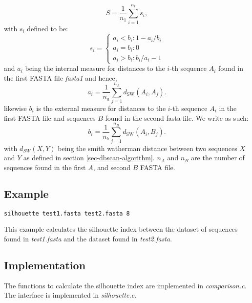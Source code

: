 \begin{equation}
  S=\frac{1}{n_1}\sum_{i=1}^{n_{1}} s_{i},
\end{equation}
with $s_i$ defined to be:
\begin{equation}
  s_i=\left\{
  \begin{array}{l}
    a_i < b_i : 1-a_i/b_i \\
    a_i = b_i : 0 \\
    a_i > b_i : b_i/a_i-1
  \end{array} \right.
\end{equation}
and $a_i$ being the internal measure for distances to the $i$-th
sequence $A_i$ found in the first FASTA file \emph{fasta1} and hence,
\begin{equation}
  a_i = \frac{1}{n_a}\sum_{j=1}^{n_A}d_{\mathrm{SW}}(A_i,A_j).
\end{equation}
likewise $b_i$ is the external measure for distances to the $i$-th
sequence $A_i$ in the first FASTA file and sequences $B$ found in the
second fasta file. We write as such:
\begin{equation}
  b_i = \frac{1}{n_b}\sum_{j=1}^{n_B}d_{\mathrm{SW}}(A_i,B_j).
\end{equation}
with $d_{SW}(X,Y)$ being the smith watherman distance between two
sequences $X$ and $Y$ as defined in section
\ref{sec-dbscan-algorithm}. $n_A$ and $n_B$ are the number of
sequences found in the first $A$, and second $B$ FASTA file. 

\subsection{Example}
\begin{lstlisting}
silhouette test1.fasta test2.fasta 8
\end{lstlisting}
This example calculates the silhouette index between the dataset of
sequences found  in \emph{test1.fasta} and the dataset found in
\emph{test2.fasta}.

\subsection{Implementation}
The functions to calculate the silhouette index are implemented in
\emph{comparison.c}. The interface is implemented in
\emph{silhouette.c}.



